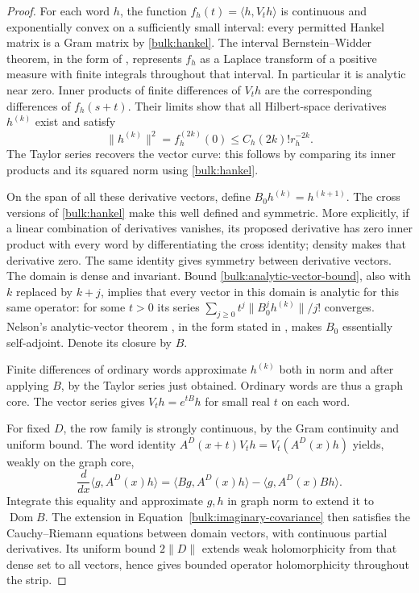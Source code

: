 \begin{proof}
For each word $h$, the function
$f_h(t)=\langle h,V_th\rangle$ is continuous and exponentially
convex on a sufficiently small interval: every permitted Hankel
matrix is a Gram matrix by \eqref{bulk:hankel}. The interval
Bernstein--Widder theorem, in the form of
\cite[Theorem~3.4 and Corollary~3.5, p.~735]{BuescuPaixao2018}, represents
$f_h$ as a Laplace transform of a positive measure with finite
integrals throughout that interval. In particular it is analytic
near zero. Inner products of finite differences of $V_th$ are
the corresponding differences of $f_h(s+t)$. Their limits show
that all Hilbert-space derivatives $h^{(k)}$ exist and satisfy
\begin{equation}\label{bulk:analytic-vector-bound}
 \|h^{(k)}\|^2=f_h^{(2k)}(0)
 \le C_h(2k)!r_h^{-2k}.
\end{equation}
The Taylor series recovers the vector curve: this follows by
comparing its inner products and its squared norm using
\eqref{bulk:hankel}.

On the span of all these derivative vectors, define
$B_0h^{(k)}=h^{(k+1)}$. The cross versions of
\eqref{bulk:hankel} make this well defined and symmetric. More
explicitly, if a linear combination of derivatives vanishes, its
proposed derivative has zero inner product with every word by
differentiating the cross identity; density makes that derivative
zero. The same identity gives symmetry between derivative
vectors. The domain is dense and invariant. Bound
\eqref{bulk:analytic-vector-bound}, also with $k$ replaced by $k+j$,
implies that every vector in this domain is analytic for this same
operator: for some $t>0$ its series
$\sum_{j\ge0}t^j\|B_0^jh^{(k)}\|/j!$ converges. Nelson's analytic-vector theorem \citep[Lemma~5.1]{Nelson1959}, in the
form stated in \citet[Definition~4.7 and Theorem~4.8]{Neeb2011}, makes $B_0$
essentially self-adjoint. Denote its closure by $B$.

Finite differences of ordinary words approximate $h^{(k)}$ both
in norm and after applying $B$, by the Taylor series just obtained.
Ordinary words are thus a graph core. The vector series gives
$V_th=e^{tB}h$ for small real $t$ on each word.

For fixed $D$, the row family is strongly continuous, by the Gram
continuity and uniform bound. The word identity
$A^D(x+t)V_th=V_t(A^D(x)h)$ yields, weakly on the graph core,
\[
 \frac{d}{dx}\langle g,A^D(x)h\rangle
 =\langle Bg,A^D(x)h\rangle-\langle g,A^D(x)Bh\rangle.
\]
Integrate this equality and approximate $g,h$ in graph norm to
extend it to $\operatorname{Dom}B$. The extension in
Equation~\eqref{bulk:imaginary-covariance} then satisfies the Cauchy--Riemann
equations between domain vectors, with continuous partial
derivatives. Its uniform bound $2\|D\|$ extends weak holomorphicity
from that dense set to all vectors, hence gives bounded operator
holomorphicity throughout the strip.
\end{proof}

